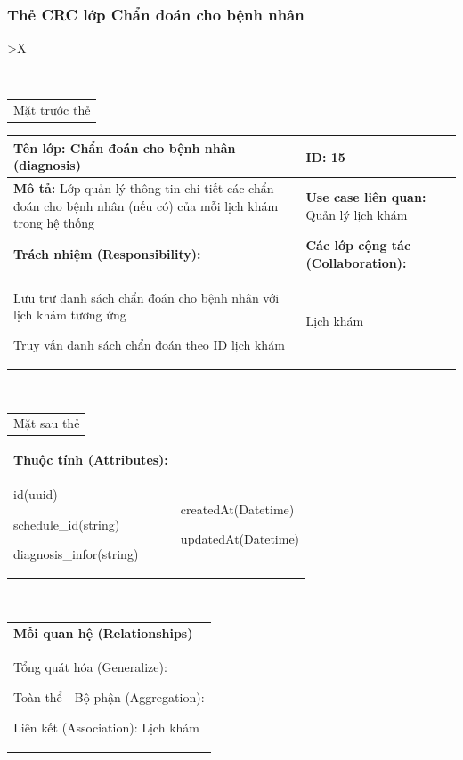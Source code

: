 \subsubsection{Thẻ CRC lớp Chẩn đoán cho bệnh nhân}

\begin{xltabular}{\textwidth}{
		>{\centering\arraybackslash}X
	}
	\caption{\bfseries \fontsize{12pt}{0pt}\selectfont Thẻ CRC lớp Chẩn đoán cho bệnh nhân}
	\\
	\begin{tabularx}{0.9\textwidth}{X}
		Mặt trước thẻ
	\end{tabularx}
	\begin{tabularx}{0.9\textwidth}{|X|X|}
		\hline
		\textbf{Tên lớp:} Chẩn đoán cho bệnh nhân (diagnosis)                                                                & \textbf{ID:} 15                                 \\
		\hline
		\textbf{Mô tả:} Lớp quản lý thông tin chi tiết các chẩn đoán cho bệnh nhân (nếu có) của mỗi lịch khám trong hệ thống & \textbf{Use case liên quan:}  Quản lý lịch khám \\
		\hline
		\textbf{Trách nhiệm (Responsibility):}                                                                               & \textbf{Các lớp cộng tác (Collaboration):}      \\
		Lưu trữ danh sách chẩn đoán cho bệnh nhân với lịch khám tương ứng

		Truy vấn danh sách chẩn đoán theo ID lịch khám
		                                                                                                                     &
		Lịch khám
		\\
		\hline
	\end{tabularx}
	\\
	\begin{tabularx}{0.9\textwidth}{X}
		Mặt sau thẻ
	\end{tabularx}
	\begin{tabularx}{0.9\textwidth}{|X|X|}
		\hline
		\textbf{Thuộc tính (Attributes):} & \\
		id(uuid)

		schedule\_id(string)

		diagnosis\_infor(string)
		                                  &
		createdAt(Datetime)

		updatedAt(Datetime)
		\\ \hline
	\end{tabularx}
	\\
	\begin{tabularx}{0.9\textwidth}{|X|}
		\hline
		\textbf{Mối quan hệ (Relationships)} \\
		Tổng quát hóa (Generalize):

		Toàn thể - Bộ phận (Aggregation):

		Liên kết (Association): Lịch khám
		\\
		\hline
	\end{tabularx}
\end{xltabular}

